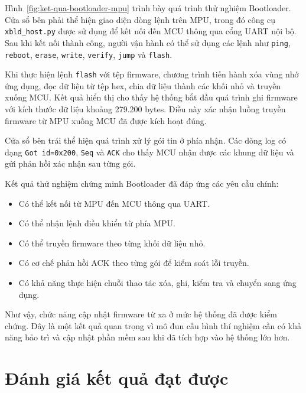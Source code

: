 Hình~\ref{fig:ket-qua-bootloader-mpu} trình bày quá trình thử nghiệm Bootloader. Cửa sổ bên phải thể hiện giao diện dòng lệnh trên MPU, trong đó công cụ \texttt{xbld\_host.py} được sử dụng để kết nối đến MCU thông qua cổng UART nội bộ. Sau khi kết nối thành công, người vận hành có thể sử dụng các lệnh như \texttt{ping}, \texttt{reboot}, \texttt{erase}, \texttt{write}, \texttt{verify}, \texttt{jump} và \texttt{flash}.

Khi thực hiện lệnh \texttt{flash} với tệp firmware, chương trình tiến hành xóa vùng nhớ ứng dụng, đọc dữ liệu từ tệp hex, chia dữ liệu thành các khối nhỏ và truyền xuống MCU. Kết quả hiển thị cho thấy hệ thống bắt đầu quá trình ghi firmware với kích thước dữ liệu khoảng 279.200 bytes. Điều này xác nhận luồng truyền firmware từ MPU xuống MCU đã được kích hoạt đúng.

Cửa sổ bên trái thể hiện quá trình xử lý gói tin ở phía nhận. Các dòng log có dạng \texttt{Got id=0x200}, \texttt{Seq} và \texttt{ACK} cho thấy MCU nhận được các khung dữ liệu và gửi phản hồi xác nhận sau từng gói. 

Kết quả thử nghiệm chứng minh Bootloader đã đáp ứng các yêu cầu chính:

\begin{itemize}
    \item Có thể kết nối từ MPU đến MCU thông qua UART.
    \item Có thể nhận lệnh điều khiển từ phía MPU.
    \item Có thể truyền firmware theo từng khối dữ liệu nhỏ.
    \item Có cơ chế phản hồi ACK theo từng gói để kiểm soát lỗi truyền.
    \item Có khả năng thực hiện chuỗi thao tác xóa, ghi, kiểm tra và chuyển sang ứng dụng.
\end{itemize}

Như vậy, chức năng cập nhật firmware từ xa ở mức hệ thống đã được kiểm chứng. Đây là một kết quả quan trọng vì mô đun cấu hình thí nghiệm cần có khả năng bảo trì và cập nhật phần mềm sau khi đã tích hợp vào hệ thống lớn hơn.

\section{Đánh giá kết quả đạt được}
\label{sec:danh-gia-ket-qua}

